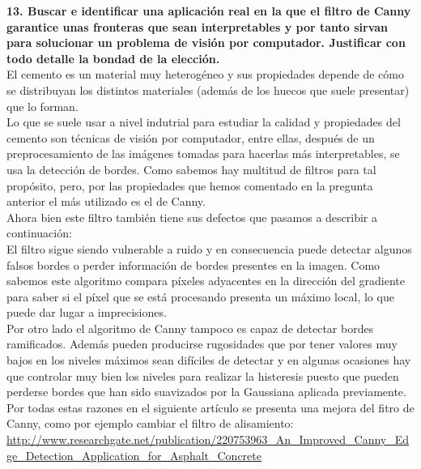 \documentclass[10pt,a4paper]{article}
\begin{document}
\textbf{13. Buscar e identificar una aplicación real en la que el filtro de
Canny garantice unas fronteras que sean interpretables y por tanto sirvan
para solucionar un problema de visión por computador. Justificar con todo
detalle la bondad de la elección.}\\

El cemento es un material muy heterogéneo y sus propiedades depende de cómo se distribuyan los distintos materiales (además de los huecos que suele presentar) que lo forman.\\

Lo que se suele usar a nivel indutrial para estudiar la calidad y propiedades del cemento son técnicas de visión por computador, entre ellas, después de un preprocesamiento de las imágenes tomadas para hacerlas más interpretables, se usa la detección de bordes. Como sabemos hay multitud de filtros para tal propósito, pero, por las propiedades que hemos comentado en la pregunta anterior el más utilizado es el de Canny.\\

Ahora bien este filtro también tiene sus defectos que pasamos a describir a continuación:\\

El filtro sigue siendo vulnerable a ruido y en consecuencia puede detectar algunos falsos bordes o perder información de bordes presentes en la imagen. Como sabemos este algoritmo compara píxeles adyacentes en la dirección del gradiente para saber si el píxel que se está procesando presenta un máximo local, lo que puede dar lugar a imprecisiones.\\

Por otro lado el algoritmo de Canny tampoco es capaz de detectar bordes ramificados. Además pueden producirse rugosidades que por tener valores muy bajos en los niveles máximos sean difíciles de detectar y en algunas ocasiones hay que controlar muy bien los niveles para realizar la histeresis puesto que pueden perderse bordes que han sido suavizados por la Gaussiana aplicada previamente.\\

Por todas estas razones en el siguiente artículo se presenta una mejora del fitro de Canny, como por ejemplo cambiar el filtro de alisamiento:\\

\url{http://www.researchgate.net/publication/220753963_An_Improved_Canny_Edge_Detection_Application_for_Asphalt_Concrete}\\


\end{document}
